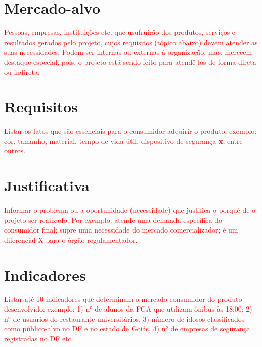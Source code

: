 \section{Mercado-alvo}

\textcolor{red}{Pessoas, empresas, instituições etc. que usufruirão dos produtos, serviços e resultados gerados pelo projeto, cujos requisitos (tópico abaixo) devem atender as suas necessidades. Podem ser internas ou externas à organização, mas, merecem destaque especial, pois, o projeto está sendo feito para atendê-los de forma direta ou indireta.}

\section{Requisitos}

\textcolor{red}{Listar os fatos que são essenciais para o consumidor adquirir o produto, exemplo: cor, tamanho, material, tempo de vida-útil, dispositivo de segurança \textbf{x}, entre outros.}

\section{Justificativa}

\textcolor{red}{Informar o problema ou a oportunidade (necessidade) que justifica o porquê de o projeto ser realizado. Por exemplo: atende uma demanda específica do consumidor final; supre uma necessidade do mercado comercializador; é um diferencial X para o órgão regulamentador.}

\section{Indicadores}

\textcolor{red}{Listar até 10 indicadores que determinam o mercado consumidor do produto desenvolvido: exemplo: 1) n° de alunos da FGA que utilizam ônibus às 18:00; 2) n° de usuários do restaurante universitários, 3) número de idosos classificados como público-alvo no DF e no estado de Goiás, 4) n° de empresas de segurança registradas no DF etc.}

